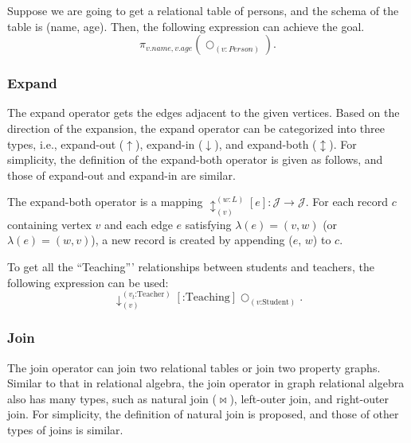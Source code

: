 \begin{example}
    Suppose we are going to get a relational table of persons, and the schema of the table is (name, age).
    Then, the following expression can achieve the goal.
    \begin{equation*}
        \pi_{v.name, v.age}(\bigcirc_{(v:Person)}).
    \end{equation*}
\end{example}

\subsubsection{Expand}

The expand operator gets the edges adjacent to the given vertices.
Based on the direction of the expansion, the expand operator can be categorized into three types, i.e., expand-out ($\uparrow$), expand-in ($\downarrow$), and expand-both ($\updownarrow$).
For simplicity, the definition of the expand-both operator is given as follows, and those of expand-out and expand-in are similar.

\begin{definition}
    The expand-both operator is a mapping $\updownarrow_{(v)}^{(w:L)}[e] : \mathcal{J} \rightarrow \mathcal{J}$.
    For each record $c$ containing vertex $v$ and each edge $e$ satisfying $\lambda(e) = (v, w)$ (or $\lambda(e) = (w, v)$), a new record is created by appending ($e$, $w$) to $c$.
\end{definition}
 
\begin{example}
    To get all the ``Teaching''' relationships between students and teachers, the following expression can be used:
    \begin{equation*}
        \downarrow_{(v)}^{(v_t\text{:Teacher})}[\text{:Teaching}]\bigcirc_{(v\text{:Student})}.
    \end{equation*}
\end{example}

\subsubsection{Join}

The join operator can join two relational tables or join two property graphs.
Similar to that in relational algebra, the join operator in graph relational algebra also has many types, such as natural join ($\Join$), left-outer join, and right-outer join.
For simplicity, the definition of natural join is proposed, and those of other types of joins is similar.

